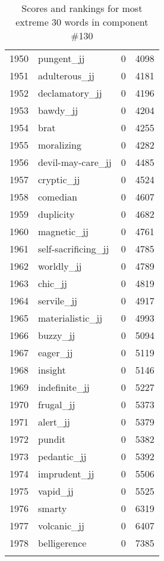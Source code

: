 \begin{longtable}[!htbp]{| rlr@{.}l |}
    1950 & pungent\_jj & 0 & 4098 \\
    1951 & adulterous\_jj & 0 & 4181 \\
    1952 & declamatory\_jj & 0 & 4196 \\
    1953 & bawdy\_jj & 0 & 4204 \\
    1954 & brat & 0 & 4255 \\
    1955 & moralizing & 0 & 4282 \\
    1956 & devil-may-care\_jj & 0 & 4485 \\
    1957 & cryptic\_jj & 0 & 4524 \\
    1958 & comedian & 0 & 4607 \\
    1959 & duplicity & 0 & 4682 \\
    1960 & magnetic\_jj & 0 & 4761 \\
    1961 & self-sacrificing\_jj & 0 & 4785 \\
    1962 & worldly\_jj & 0 & 4789 \\
    1963 & chic\_jj & 0 & 4819 \\
    1964 & servile\_jj & 0 & 4917 \\
    1965 & materialistic\_jj & 0 & 4993 \\
    1966 & buzzy\_jj & 0 & 5094 \\
    1967 & eager\_jj & 0 & 5119 \\
    1968 & insight & 0 & 5146 \\
    1969 & indefinite\_jj & 0 & 5227 \\
    1970 & frugal\_jj & 0 & 5373 \\
    1971 & alert\_jj & 0 & 5379 \\
    1972 & pundit & 0 & 5382 \\
    1973 & pedantic\_jj & 0 & 5392 \\
    1974 & imprudent\_jj & 0 & 5506 \\
    1975 & vapid\_jj & 0 & 5525 \\
    1976 & smarty & 0 & 6319 \\
    1977 & volcanic\_jj & 0 & 6407 \\
    1978 & belligerence & 0 & 7385 \\
    \hline
    \caption{Scores and rankings for most extreme 30 words in component \#130} \\
\end{longtable}

